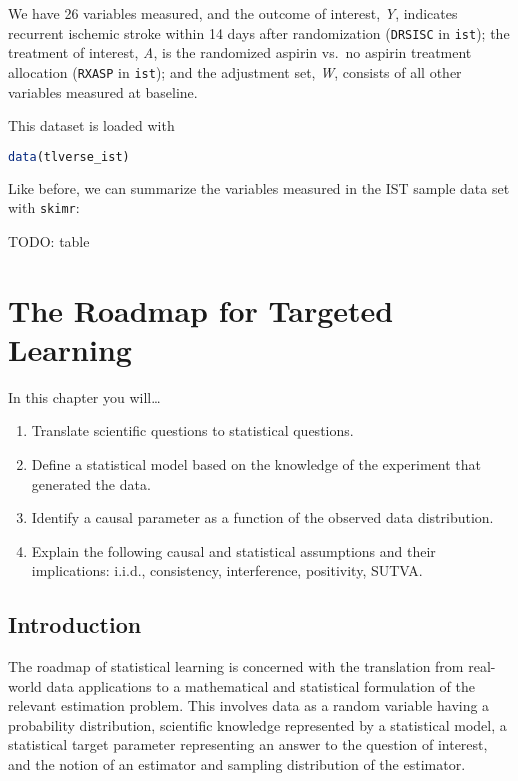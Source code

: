 \documentclass[
  12pt, krantz2,
]{krantz}
\newcommand{\passthrough}[1]{#1}
\providecommand{\tightlist}{%
  \setlength{\itemsep}{0pt}\setlength{\parskip}{0pt}}
\theoremstyle{definition}
\theoremstyle{definition}
\theoremstyle{definition}
\newcommand{\1}{\mathbbm{1}}
\begin{document}
We have 26 variables measured, and the outcome of interest, \emph{Y}, indicates recurrent ischemic stroke within 14 days after randomization (\passthrough{\lstinline!DRSISC!} in \passthrough{\lstinline!ist!}); the treatment of interest, \emph{A}, is the randomized aspirin vs.~no aspirin treatment allocation (\passthrough{\lstinline!RXASP!} in \passthrough{\lstinline!ist!}); and the adjustment set, \emph{W}, consists of all other variables measured at baseline.

This dataset is loaded with

\begin{lstlisting}[language=R]
data(tlverse_ist)
\end{lstlisting}

Like before, we can summarize the variables measured in the IST sample data set with \passthrough{\lstinline!skimr!}:

TODO: table

\hypertarget{roadmap}{%
\chapter{The Roadmap for Targeted Learning}\label{roadmap}}

In this chapter you will\ldots{}

\begin{enumerate}
\def\labelenumi{\arabic{enumi}.}
\tightlist
\item
  Translate scientific questions to statistical questions.
\item
  Define a statistical model based on the knowledge of the experiment that generated the data.
\item
  Identify a causal parameter as a function of the observed data distribution.
\item
  Explain the following causal and statistical assumptions and their implications: i.i.d., consistency, interference, positivity, SUTVA.
\end{enumerate}

\hypertarget{introduction}{%
\section{Introduction}\label{introduction}}

The roadmap of statistical learning is concerned with the translation from real-world data applications to a mathematical and statistical formulation of the relevant estimation problem. This involves data as a random variable having a probability distribution, scientific knowledge represented by a statistical model, a statistical target parameter representing an answer to the question of interest, and the notion of an estimator and sampling distribution of the estimator.
\end{document}
